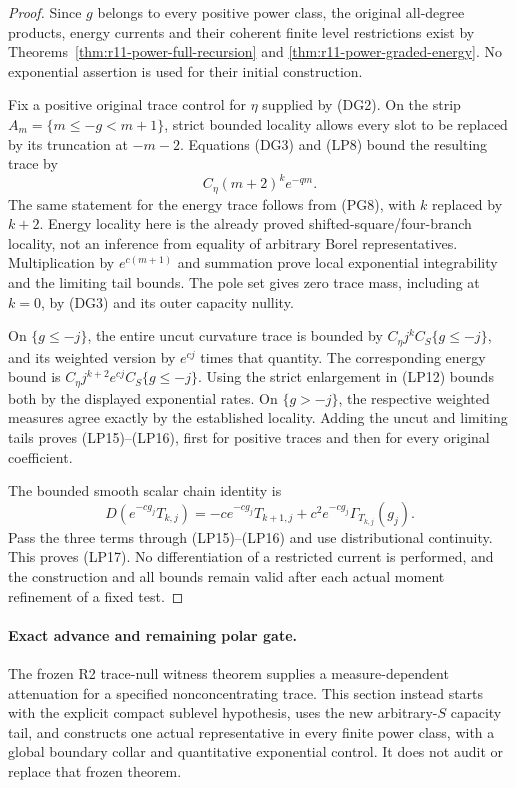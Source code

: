 \documentclass[11pt,a4paper]{article}
\numberwithin{equation}{section}
\theoremstyle{definition}
\theoremstyle{remark}
\begin{document}
\begin{proof}
Since $g$ belongs to every positive power class, the original
all-degree products, energy currents and their coherent finite
level restrictions exist by
Theorems~\ref{thm:r11-power-full-recursion} and
\ref{thm:r11-power-graded-energy}. No exponential assertion
is used for their initial construction.

Fix a positive original trace control for $\eta$ supplied by
(DG2). On the strip $A_m=\{m\leq-g<m+1\}$, strict
bounded locality allows every slot to be replaced by its
truncation at $-m-2$. Equations (DG3) and (LP8) bound the
resulting trace by
\[
                         C_\eta(m+2)^k e^{-qm}.
\]
The same statement for the energy trace follows from (PG8),
with $k$ replaced by $k+2$. Energy locality here is the
already proved shifted-square/four-branch locality, not an
inference from equality of arbitrary Borel representatives.
Multiplication by $e^{c(m+1)}$ and summation prove local
exponential integrability and the limiting tail bounds.
The pole set gives zero trace mass, including at $k=0$,
by (DG3) and its outer capacity nullity.

On $\{g\leq-j\}$, the entire uncut curvature trace is
bounded by $C_\eta j^k C_S\{g\leq-j\}$, and its weighted
version by $e^{cj}$ times that quantity. The corresponding
energy bound is $C_\eta j^{k+2}e^{cj}C_S\{g\leq-j\}$.
Using the strict enlargement in (LP12) bounds both by the
displayed exponential rates. On $\{g>-j\}$, the respective
weighted measures agree exactly by the established locality.
Adding the uncut and limiting tails proves (LP15)--(LP16),
first for positive traces and then for every original coefficient.

The bounded smooth scalar chain identity is
\[
 D(e^{-cg_j}T_{k,j})
     =-c e^{-cg_j}T_{k+1,j}
                  +c^2e^{-cg_j}\Gamma_{T_{k,j}}(g_j).
\]
Pass the three terms through (LP15)--(LP16) and use
distributional continuity. This proves (LP17).
No differentiation of a restricted current is performed,
and the construction and all bounds remain valid after
each actual moment refinement of a fixed test.
\end{proof}

\paragraph{Exact advance and remaining polar gate.}
The frozen R2 trace-null witness theorem supplies a
measure-dependent attenuation for a specified nonconcentrating
trace. This section instead starts with the explicit compact
sublevel hypothesis, uses the new arbitrary-$S$ capacity tail,
and constructs one actual representative in every finite power
class, with a global boundary collar and quantitative exponential
control. It does not audit or replace that frozen theorem.
\end{document}
